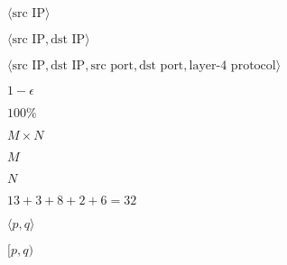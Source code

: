 \documentclass{article}
\begin{document}
$\langle \textrm{src IP}\rangle$
\pagebreak

$\langle \textrm{src IP}, \textrm{dst IP}\rangle$
\pagebreak

$\langle \textrm{src IP}, \textrm{dst IP}, \textrm{src port}, \textrm{dst port}, \textrm{layer-4 protocol}\rangle$
\pagebreak

$1-\epsilon$
\pagebreak

$100\%$
\pagebreak

$M\times N$
\pagebreak

$M$
\pagebreak

$N$
\pagebreak

$13+3+8+2+6=32$
\pagebreak

$\langle p,q\rangle$
\pagebreak

$[p,q)$
\pagebreak
\end{document}
